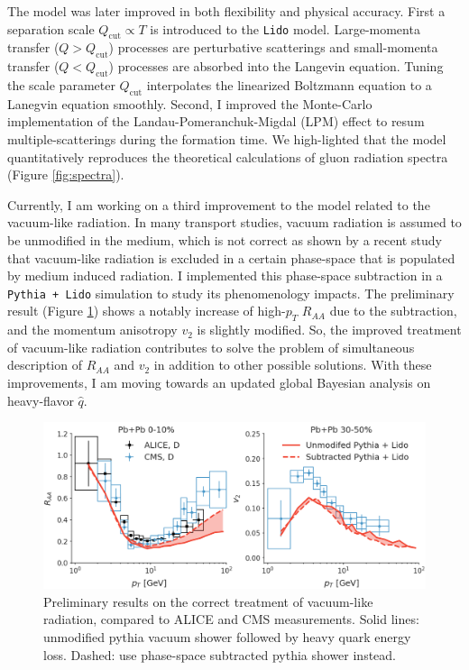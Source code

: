 \documentclass[12pt,a4paper]{revtex4-1}
\begin{document}
The model was later improved in both flexibility and physical accuracy. 
First a separation scale $Q_{\textrm{cut}}\propto T$ is introduced to the {\tt Lido} model. 
Large-momenta transfer ($Q > Q_{\textrm{cut}}$) processes are perturbative scatterings and small-momenta transfer ($Q < Q_{\textrm{cut}}$) processes are absorbed into the Langevin equation. 
Tuning the scale parameter $Q_{\textrm{cut}}$ interpolates the linearized Boltzmann equation to a Lanegvin equation smoothly.
Second, I improved the Monte-Carlo implementation of the Landau-Pomeranchuk-Migdal (LPM) effect to resum multiple-scatterings during the formation time. 
We high-lighted that the model quantitatively reproduces the theoretical calculations of gluon radiation spectra (Figure \ref{fig:spectra}).

Currently, I am working on a third improvement to the model related to the vacuum-like radiation. 
In many transport studies, vacuum radiation is assumed to be unmodified in the medium, which is not correct as shown by a recent study \cite{Caucal:2018dla} that vacuum-like radiation is excluded in a certain phase-space that is populated by medium induced radiation.
I implemented this phase-space subtraction in a {\tt Pythia + Lido} simulation to study its phenomenology impacts.
The preliminary result (Figure \ref{fig:prelim}) shows a notably increase of high-$p_T$ $R_{AA}$ due to the subtraction, and the momentum anisotropy $v_2$ is slightly modified.
So, the improved treatment of vacuum-like radiation contributes to solve the problem of simultaneous description of $R_{AA}$ and $v_2$ in addition to other possible solutions.
With these improvements, I am moving towards an updated global Bayesian analysis on heavy-flavor $\hat{q}$.

\begin{figure}[ht]
\begin{center}
\includegraphics[width=.85\textwidth]{Lido_obs.png}
\caption{Preliminary results on the correct treatment of vacuum-like radiation, compared to ALICE \cite{Acharya:2018hre} and CMS \cite{Sirunyan:2017plt} measurements. Solid lines: unmodified pythia vacuum shower followed by heavy quark energy loss. Dashed: use phase-space subtracted pythia shower instead.}\label{fig:prelim}
\end{center}
\end{figure}
\end{document}

